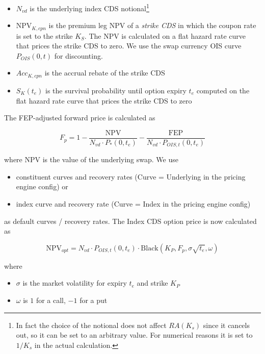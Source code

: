 \begin{itemize}
\item $N_{vd}$ is the underlying index CDS notional\footnote{In fact the choice of the notional does not affect
$RA(K_s)$ since it cancels out, so it can be set to an arbitrary value. For numerical reasons it is set to $1/K_s$ in
the actual calculation.}
\item $\text{NPV}_{K,cpn}$ is the premium leg NPV of a {\em strike CDS} in which the coupon rate is set to the strike
  $K_S$. The NPV is calculated on a flat hazard rate curve that prices the strike CDS to zero. We use the swap currency
  OIS curve $P_{OIS}(0,t)$ for discounting.
\item $Acc_{K,cpn}$ is the accrual rebate of the strike CDS
\item $S_K(t_e)$ is the survival probability until option expiry $t_e$ computed on the flat hazard rate curve that prices
  the strike CDS to zero
\end{itemize}

The FEP-adjusted forward price is calculated as

\begin{equation}\label{pricing:cr_indexcdsoption_fep_adjusted_forward}
F_p = 1- \frac{\text{NPV}}{N_{vd} \cdot P_{*}(0,t_e)} - \frac{\text{FEP}}{N_{vd} \cdot P_{OIS,t}(0,t_e)}
\end{equation}

where NPV is the value of the underlying swap. We use

\begin{itemize}
\item constituent curves and recovery rates (Curve = Underlying in the pricing engine config) or
\item index curve and recovery rate (Curve = Index in the pricing engine config)
\end{itemize}

as default curves / recovery rates. The Index CDS option price is now calculated as

\begin{equation}
\text{NPV}_{opt} = N_{vd} \cdot P_{OIS,t}(0, t_e) \cdot \text{Black} \left( K_P, F_p, \sigma\sqrt{t_e}, \omega \right)
\end{equation}

where

\begin{itemize}
\item $\sigma$ is the market volatility for expiry $t_e$ and strike $K_P$
\item $\omega$ is $1$ for a call, $-1$ for a put
\end{itemize}

